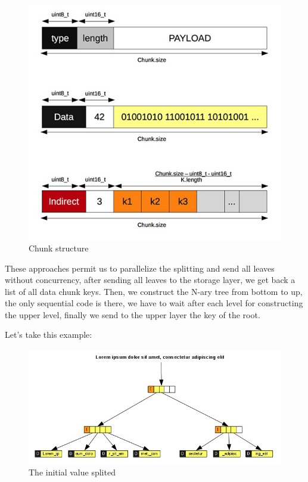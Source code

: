 \documentclass[10pt,a4paper]{report}
\begin{document}
\begin{figure}[H]
\centerline{\includegraphics[scale=0.6]{img/chunk-structure.jpg}}
\caption{Chunk structure}
\end{figure}

These approaches permit us to parallelize the splitting and send all leaves without concurrency, after sending all leaves to the storage layer, we get back a list of all data chunk keys. 
Then, we construct the N-ary tree from bottom to up, the only sequential code is there, we have to wait after each level for constructing the upper level, finally we send to the upper layer the key of the root. \newline

Let's take this example: \newline
\begin{figure}[H]
\centerline{\includegraphics[scale=0.5]{img/chunk-original.jpg}}
\caption{The initial value splited}
\end{figure}
\end{document}

